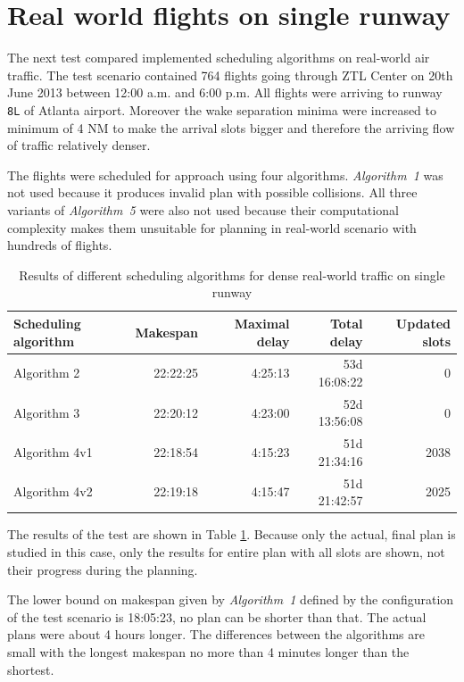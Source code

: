\section{Real world flights on single runway}

The next test compared implemented scheduling algorithms on real-world air traffic. The test scenario contained 764 flights going through ZTL Center on 20th June 2013 between 12:00 a.m. and 6:00 p.m. All flights were arriving to runway \texttt{8L} of Atlanta airport. Moreover the wake separation minima were increased to minimum of 4 NM  to make the arrival slots bigger and therefore the arriving flow of traffic relatively denser.

The flights were scheduled for approach using four algorithms. {\em Algorithm~1} was not used because it produces invalid plan with possible collisions. All three variants of {\em Algorithm~5} were also not used because their computational complexity makes them unsuitable for planning in real-world scenario with hundreds of flights.

\begin{table}[h]
  \centering
\begin{tabular}{|l|r|r|r|r|}
\hline
Scheduling algorithm & Makespan  & Maximal delay & Total delay & Updated slots \\
\hline
Algorithm 2   & 22:22:25  & 4:25:13 & 53d 16:08:22 & 0    \\
Algorithm 3   & 22:20:12  & 4:23:00 & 52d 13:56:08 & 0    \\
Algorithm 4v1 & 22:18:54  & 4:15:23 & 51d 21:34:16 & 2038 \\
Algorithm 4v2 & 22:19:18  & 4:15:47 & 51d 21:42:57 & 2025 \\
\hline
\end{tabular}
  \caption{Results of different scheduling algorithms for dense real-world traffic on single runway}
  \label{tab:1rwy-real}
\end{table}

The results of the test are shown in Table \ref{tab:1rwy-real}. Because only the actual, final plan is studied in this case, only the results for entire plan with all slots are shown, not their progress during the planning.

The lower bound on makespan given by {\em Algorithm~1} defined by the configuration of the test scenario is 18:05:23, no plan can be shorter than that. The actual plans were about 4 hours longer. The differences between the algorithms are small with the longest makespan no more than 4 minutes longer than the shortest.

